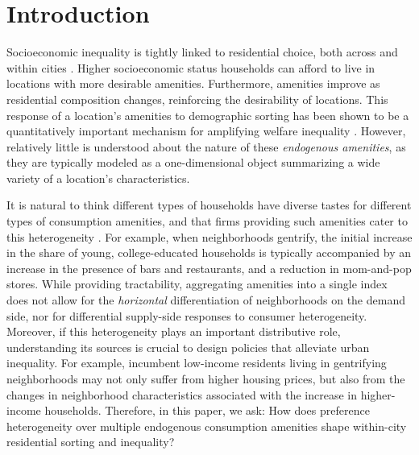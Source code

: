 \documentclass[11pt]{article}
\begin{document}
\newpage
\onehalfspacing

\section{Introduction}\label{sec: introduction}


Socioeconomic inequality is tightly linked to residential choice, both across and within cities \citep{moretti2013real}. Higher socioeconomic status households can afford to live in locations with more desirable amenities. Furthermore, amenities improve as residential composition changes, reinforcing the desirability of locations. This response of a location's amenities to demographic sorting has been shown to be a quantitatively important mechanism for amplifying welfare inequality \citep{guerrieri2013endogenous, diamond16}. However, relatively little is understood about the nature of these \emph{endogenous amenities}, as they are typically modeled as a one-dimensional object summarizing a wide variety of a location's characteristics.

It is natural to think different types of households have diverse tastes for different types of consumption amenities, and that firms providing such amenities cater to this heterogeneity \citep{george2003affects}. For example, when neighborhoods gentrify, the initial increase in the share of young, college-educated households is typically accompanied by an increase in the presence of bars and restaurants, and a reduction in mom-and-pop stores. While providing tractability, aggregating amenities into a single index does not allow for the \emph{horizontal} differentiation of neighborhoods on the demand side, nor for differential supply-side responses to consumer heterogeneity. Moreover, if this heterogeneity plays an important distributive role, understanding its sources is crucial to design policies that alleviate urban inequality. For example, incumbent low-income residents living in gentrifying neighborhoods may not only suffer from higher housing prices, but also from the changes in neighborhood characteristics associated with the increase in higher-income households. Therefore, in this paper, we ask: How does preference heterogeneity over multiple endogenous consumption amenities shape within-city residential sorting and inequality?
\end{document}

